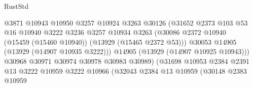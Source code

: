 \begin{lexlean}{RustStd}
\begin{coremodule}
                                            @3871
                                            @10943
                                            @10950
                                            @3257
                                            @10924
                                            @3263
                                            @30126
                                            (@31652
                                              @2373
                                              @103
                                              @53
                                              @16
                                              @10940
                                              @3222
                                              @3236
                                              @3257
                                              @10934
                                              @3263
                                              (@30086
                                                @2372
                                                @10940
                                                (@15459 (@15460 @10940))
                                                (@13929 (@15465 @2372 @53)))
                                              @30053
                                              @14905
                                              (@13929 (@14907 @10935 @3222)))
                                            @14905
                                            (@13929 (@14907 @10925 @10943)))
                                          @30968
                                          @30971
                                          @30974
                                          @30978
                                          @30983
                                          @30989)
                                        (@31698
                                          @10953
                                          @2384
                                          @2391
                                          @13
                                          @3222
                                          @10959
                                          @3222
                                          @10966
                                          (@32043
                                            @2384
                                            @13
                                            @10959
                                            (@30148
                                              @2383
                                              @10959

\end{coremodule}
\end{lexlean}
